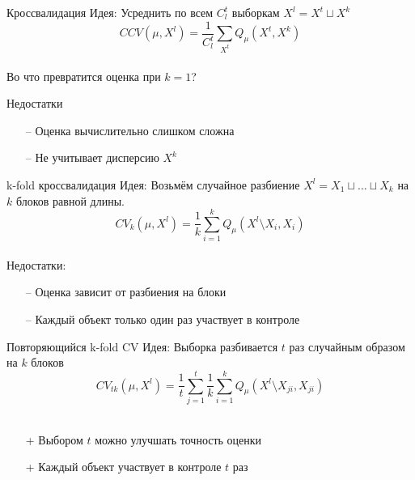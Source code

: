 \documentclass[10pt]{beamer}
\begin{document}
{
\begin{frame}{Кроссвалидация}  
  \alert{Идея}: Усреднить по всем $C_l^t$ выборкам $X^l = X^t \sqcup X^k$\\
  $$CCV(\mu, X^l) = \frac{1}{C_l^t} \sum\limits_{X^t} Q_{\mu}(X^t, X^k)$$\\
  \bigbreak
  \pause
  Во что превратится оценка при $k=1$?
\end{frame}
}

\begin{frame}{Недостатки}  
  \begin{enumerate}
    \item[--] Оценка вычислительно слишком сложна
    \item[--] Не учитывает дисперсию $X^k$
  \end{enumerate}
\end{frame}

\begin{frame}{k-fold кроссвалидация}  
  \alert{Идея}: Возьмём случайное разбиение $X^l = X_1 \sqcup \dots \sqcup X_k$ на $k$ блоков равной длины.\\
  $$CV_k(\mu, X^l) = \frac{1}{k} \sum\limits_{i=1}^{k} Q_{\mu}(X^l \setminus X_i, X_i)$$\\
  \bigbreak
  \pause
  Недостатки:  
  \begin{enumerate}
    \item[--] Оценка зависит от разбиения на блоки
    \item[--] Каждый объект только один раз участвует в контроле    
  \end{enumerate}
\end{frame}

{
\begin{frame}{Повторяющийся k-fold CV}  
  \alert{Идея}: Выборка разбивается $t$ раз случайным образом на $k$ блоков\\
  
  $$CV_{tk}(\mu, X^l) = \frac{1}{t} \sum\limits_{j=1}^{t} \frac{1}{k} \sum\limits_{i=1}^{k} Q_{\mu}(X^l \setminus X_{ji}, X_{ji})$$\\
  \bigbreak
  \pause
  \begin{enumerate}
    \item[+] Выбором $t$ можно улучшать точность оценки
    \item[+] Каждый объект участвует в контроле $t$ раз
  \end{enumerate}
\end{frame}
}
\end{document}
